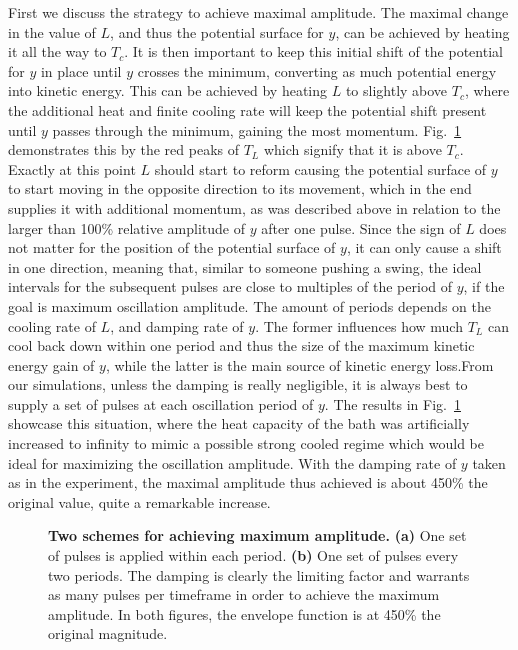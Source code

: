 First we discuss the strategy to achieve maximal amplitude.
The maximal change in the value of $L$, and thus the potential surface for $y$, can be achieved by heating it all the way to $T_c$.
It is then important to keep this initial shift of the potential for $y$ in place until $y$ crosses the minimum, converting as much potential energy into kinetic energy.
This can be achieved by heating $L$ to slightly above $T_c$, where the additional heat and finite cooling rate will keep the potential shift present until $y$ passes through the minimum, gaining the most momentum.
Fig.~\ref{fig:Cr_maximum_amp} demonstrates this by the red peaks of $T_L$ which signify that it is above $T_c$.
Exactly at this point $L$ should start to reform causing the potential surface of $y$ to start moving in the opposite direction to its movement, which in the end supplies it with additional momentum, as was described above in relation to the larger than 100\% relative amplitude of $y$ after one pulse.
Since the sign of $L$ does not matter for the position of the potential surface of $y$, it can only cause a shift in one direction, meaning that, similar to someone pushing a swing, the ideal intervals for the subsequent pulses are close to multiples of the period of $y$, if the goal is maximum oscillation amplitude.
The amount of periods depends on the cooling rate of $L$, and damping rate of $y$.
The former influences how much $T_L$ can cool back down within one period and thus the size of the maximum kinetic energy gain of $y$, while the latter is the main source of kinetic energy loss.From our simulations, unless the damping is really negligible, it is always best to supply a set of pulses at each oscillation period of $y$.
The results in Fig.~\ref{fig:Cr_maximum_amp} showcase this situation, where the heat capacity of the bath was artificially increased to infinity to mimic a possible strong cooled regime which would be ideal for maximizing the oscillation amplitude.
With the damping rate of $y$ taken as in the experiment, the maximal amplitude thus achieved is about 450\% the original value, quite a remarkable increase.  
\begin{figure}
	\caption{\label{fig:Cr_maximum_amp} {\bf Two schemes for achieving maximum amplitude.} {\bf (a)} One set of pulses is applied within each period. {\bf (b)} One set of pulses every two periods. The damping is clearly the limiting factor and warrants as many pulses per timeframe in order to achieve the maximum amplitude. In both figures, the envelope function is at 450\% the original magnitude.}
\end{figure}

